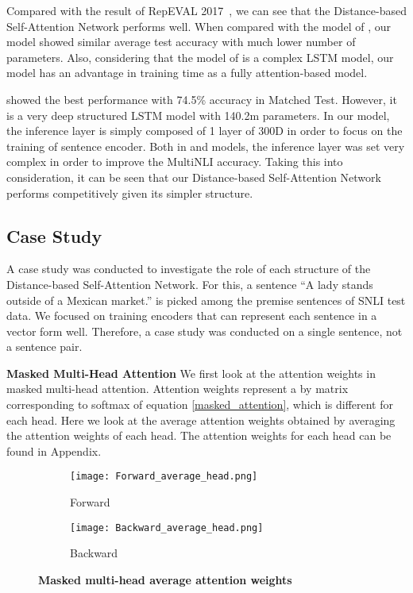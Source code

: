 \documentclass[11pt,letterpaper]{article}
\begin{document}
Compared with the result of RepEVAL 2017~\citep{RepEVAL}, we can see that the Distance-based Self-Attention Network performs well. When compared with the model of \citet{NLI_GATE}, our model showed similar average test accuracy with much lower number of parameters. Also, considering that the model of \citet{NLI_GATE} is a complex LSTM model, our model has an advantage in training time as a fully attention-based model.

\citet{MultiNLI_STACK} showed the best performance with 74.5\% accuracy in Matched Test. However, it is a very deep structured LSTM model with 140.2m parameters. In our model, the inference layer is simply composed of 1 layer of 300D in order to focus on the training of sentence encoder. Both in \citet{NLI_GATE} and \citet{MultiNLI_STACK} models, the inference layer was set very complex in order to improve the MultiNLI accuracy. Taking this into consideration, it can be seen that our Distance-based Self-Attention Network performs competitively given its simpler structure.

\subsection{Case Study}

A case study was conducted to investigate the role of each structure of the Distance-based Self-Attention Network. For this, a sentence \enquote{A lady stands outside of a Mexican market.} is picked among the premise sentences of SNLI test data. We focused on training encoders that can represent each sentence in a vector form well. Therefore, a case study was conducted on a single sentence, not a sentence pair.

\textbf{Masked Multi-Head Attention} We first look at the attention weights in masked multi-head attention. Attention weights represent a  by  matrix corresponding to softmax of equation \ref{masked_attention}, which is different for each head. Here we look at the average attention weights obtained by averaging the attention weights of each head. The attention weights for each head can be found in Appendix.

\begin{figure}[h]
\centering
\begin{subfigure}{.25\textwidth}
  \centering
  \texttt{[image: Forward\_average\_head.png]}
  \caption{Forward}
  \label{Forward_average_head}
\end{subfigure}\begin{subfigure}{.25\textwidth}
  \centering
  \texttt{[image: Backward\_average\_head.png]}
  \caption{Backward}
  \label{Backward_average_head}
\end{subfigure}
\caption{\textbf{Masked multi-head average attention weights}}
\label{masked multi-head average attention weight}
\end{figure}
\end{document}
